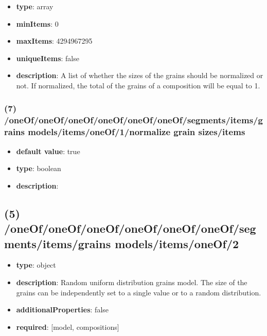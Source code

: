 \begin{itemize}[leftmargin=6em]\item {\bf type}: array
\item {\bf minItems}: 0
\item {\bf maxItems}: 4294967295
\item {\bf uniqueItems}: false
\item {\bf description}: A list of whether the sizes of the grains should be normalized or not. If normalized, the total of the grains of a composition will be equal to 1.
\end{itemize}\subsubsection{(7) /oneOf/oneOf/oneOf/oneOf/oneOf/oneOf/segments/items/grains models/items/oneOf/1/normalize grain sizes/items}
\begin{itemize}[leftmargin=7em]\item {\bf default value}: true
\item {\bf type}: boolean
\item {\bf description}: 
\end{itemize}\subsection{(5) /oneOf/oneOf/oneOf/oneOf/oneOf/oneOf/segments/items/grains models/items/oneOf/2}
\begin{itemize}[leftmargin=5em]\item {\bf type}: object
\item {\bf description}: Random uniform distribution grains model. The size of the grains can be independently set to a single value or to a random distribution.
\item {\bf additionalProperties}: false
\item {\bf required}: [model, compositions]\end{itemize}
